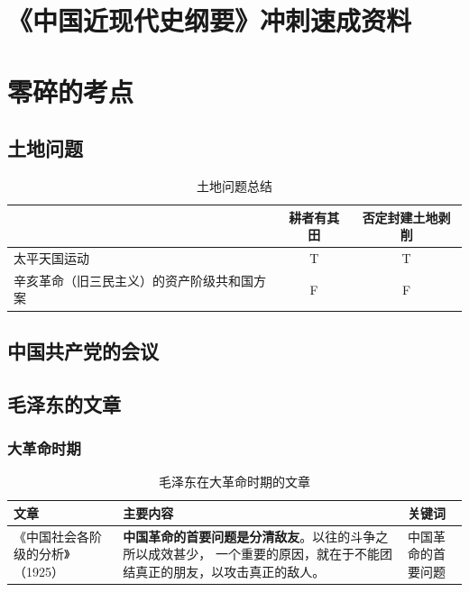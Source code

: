 \documentclass[10pt, UTF8]{book} %
\begin{document}



\chapter{《中国近现代史纲要》冲刺速成资料}

\chapter{零碎的考点}

\section{土地问题}

\begin{table}[H]
    \centering
    \caption{土地问题总结}
    \begin{tabular}{p{} c c}
        \toprule
        & 耕者有其田 & 否定封建土地剥削 \\
        \midrule 
        \hline
        太平天国运动 & T & T \\
        辛亥革命（旧三民主义）的资产阶级共和国方案 & F & F \\
        \bottomrule
    \end{tabular}
\end{table}

\section{中国共产党的会议}

\section{毛泽东的文章}

\subsection{大革命时期}

\begin{table}[H]
    \centering
    \caption{毛泽东在大革命时期的文章}
    \begin{tabular}{p{}|p{}p{}}
        \hline 
        \textbf{文章} & \textbf{主要内容} & \textbf{关键词} \\
        \hline
        《中国社会各阶级的分析》（1925）&
        \textbf{中国革命的首要问题是分清敌友}。以往的斗争之所以成效甚少，
        一个重要的原因，就在于不能团结真正的朋友，以攻击真正的敌人。
        & 中国革命的首要问题 \\ 
        \hline
    \end{tabular}
\end{table}
\end{document}

